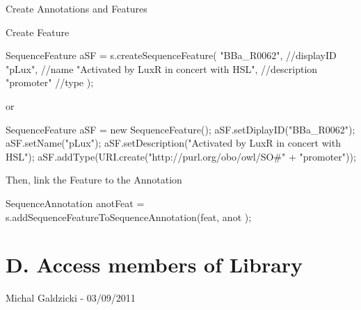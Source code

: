 \begin{DoxyEnumerate}
\begin{DoxyParagraph}{Create Annotations and Features}
\end{DoxyParagraph}

\item \begin{DoxyParagraph}{Create Feature}

\begin{DoxyCode}
SequenceFeature aSF = s.createSequenceFeature(
            "BBa_R0062",                             //displayID
            "pLux",                                  //name
            "Activated by LuxR in concert with HSL", //description
            "promoter"                               //type
            );
\end{DoxyCode}
 or 
\begin{DoxyCode}
SequenceFeature aSF = new SequenceFeature();
aSF.setDiplayID("BBa_R0062");
aSF.setName("pLux");
aSF.setDescription("Activated by LuxR in concert with HSL");
aSF.addType(URI.create("http://purl.org/obo/owl/SO#" + "promoter"));
\end{DoxyCode}

\end{DoxyParagraph}

\item \begin{DoxyParagraph}{Then, link the Feature to the Annotation}

\begin{DoxyCode}
SequenceAnnotation anotFeat = s.addSequenceFeatureToSequenceAnnotation(feat, anot
      );
\end{DoxyCode}

\end{DoxyParagraph}


 
\end{DoxyEnumerate}\hypertarget{tutorial_D}{}\section{D. Access members of Library}\label{tutorial_D}

\begin{DoxyEnumerate}
\item \begin{DoxyParagraph}{}

\end{DoxyParagraph}


 Michal Galdzicki -\/ 03/09/2011 
\end{DoxyEnumerate}